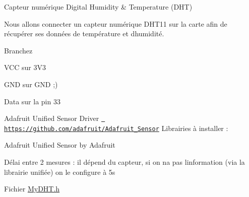 Capteur numérique Digital Humidity \& Temperature (DHT)

Nous allons connecter un capteur numérique DHT11 sur la carte afin de récupérer ses données de température et d\textquotesingle{}humidité. 

Branchez
\begin{DoxyItemize}
\item VCC sur 3V3
\item GND sur GND ;)
\item Data sur la pin 33
\end{DoxyItemize}



Adafruit Unified Sensor Driver \href{https://github.com/adafruit/Adafruit_Sensor}{\texttt{ https\+://github.\+com/adafruit/\+Adafruit\+\_\+\+Sensor}} Librairies à installer \+:
\begin{DoxyItemize}
\item Adafruit Unified Sensor by Adafruit
\end{DoxyItemize}

Délai entre 2 mesures \+: il dépend du capteur, si on n\textquotesingle{}a pas l\textquotesingle{}information (via la librairie unifiée) on le configure à 5s

Fichier \mbox{\hyperlink{_my_d_h_t_8h}{My\+DHT.\+h}} 